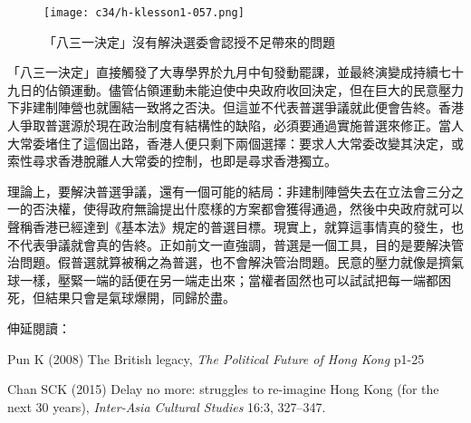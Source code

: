 \begin{figure}[htbp]
    \centering
    \texttt{[image: c34/h-klesson1-057.png]}
    \caption{「八三一決定」沒有解決選委會認授不足帶來的問題}
\end{figure}

「八三一決定」直接觸發了大專學界於九月中旬發動罷課，並最終演變成持續七十九日的佔領運動。儘管佔領運動未能迫使中央政府收回決定，但在巨大的民意壓力下非建制陣營也就團結一致將之否決。但這並不代表普選爭議就此便會告終。香港人爭取普選源於現在政治制度有結構性的缺陷，必須要通過實施普選來修正。當人大常委堵住了這個出路，香港人便只剩下兩個選擇：要求人大常委改變其決定，或索性尋求香港脫離人大常委的控制，也即是尋求香港獨立。

理論上，要解決普選爭議，還有一個可能的結局：非建制陣營失去在立法會三分之一的否決權，使得政府無論提出什麼樣的方案都會獲得通過，然後中央政府就可以聲稱香港已經達到《基本法》規定的普選目標。現實上，就算這事情真的發生，也不代表爭議就會真的告終。正如前文一直強調，普選是一個工具，目的是要解決管治問題。假普選就算被稱之為普選，也不會解決管治問題。民意的壓力就像是擠氣球一樣，壓緊一端的話便在另一端走出來；當權者固然也可以試試把每一端都困死，但結果只會是氣球爆開，同歸於盡。


伸延閱讀：

Pun K (2008) The British legacy, \textit{The Political Future of Hong Kong} p1-25

Chan SCK (2015) Delay no more: struggles to re-imagine Hong Kong (for the next 30 years), \textit{Inter-Asia Cultural Studies} 16:3, 327–347.